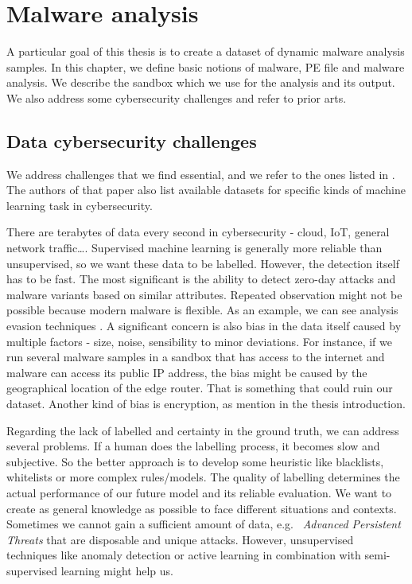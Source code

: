 \chapter{Malware analysis} \label{chap:analysis}
A particular goal of this thesis is to create a dataset of dynamic malware analysis samples. In this chapter, we define basic notions of malware, PE file and malware analysis. We describe the sandbox which we use for the analysis and its output. We also address some cybersecurity challenges and refer to prior arts.

\section{Data cybersecurity challenges}
We address challenges that we find essential, and we refer to the ones listed in \cite{Amit2019}. The authors of that paper also list available datasets for specific kinds of machine learning task in cybersecurity.

There are terabytes of data every second in cybersecurity - cloud, IoT, general network traffic\dots. Supervised machine learning is generally more reliable than unsupervised, so we want these data to be labelled. However, the detection itself has to be fast. The most significant is the ability to detect zero-day attacks and malware variants based on similar attributes. Repeated observation might not be possible because modern malware is flexible. As an example, we can see analysis evasion techniques \cite{Afianian2018}. A significant concern is also bias in the data itself caused by multiple factors - size, noise, sensibility to minor deviations. For instance, if we run several malware samples in a sandbox that has access to the internet and malware can access its public IP address, the bias might be caused by the geographical location of the edge router. That is something that could ruin our dataset. Another kind of bias is encryption, as mention in the thesis introduction.

Regarding the lack of labelled and certainty in the ground truth, we can address several problems. If a human does the labelling process, it becomes slow and subjective. So the better approach is to develop some heuristic like blacklists, whitelists or more complex rules/models. The quality of labelling determines the actual performance of our future model and its reliable evaluation. We want to create as general knowledge as possible to face different situations and contexts. Sometimes we cannot gain a sufficient amount of data, e.g. \  \emph{Advanced Persistent Threats} that are disposable and unique attacks. However, unsupervised techniques like anomaly detection or active learning in combination with semi-supervised learning might help us.

